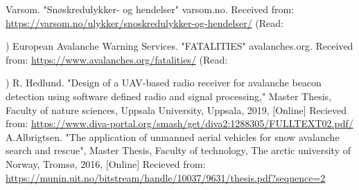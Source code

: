 \documentclass{article}
\begin{document}
\begin{thebibliography}{9}
Varsom. "Snøskredulykker- og hendelser" varsom.no. Received from: \url{https://varsom.no/ulykker/snoskredulykker-og-hendelser/} (Read: \date{09.09.21})
 European Avalanche Warning Services. "FATALITIES" avalanches.org. Received from: \url{https://www.avalanches.org/fatalities/} (Read: \date{09.09.21})
 R. Hedlund. "Design of a UAV-based radio
receiver for avalanche beacon
detection using software defined
radio and signal processing," Master Thesis, Faculty of nature sciences, Uppsala University, Uppsala, 2019, [Online] Recieved from: \url{https://www.diva-portal.org/smash/get/diva2:1288305/FULLTEXT02.pdf/}
A.Albrigtsen. "The application of unmanned aerial vehicles for snow avalanche search and rescue", Master Thesis, Faculty of technology, The arctic university of Norway, Tromsø, 2016, [Online] Recieved from: \url{https://munin.uit.no/bitstream/handle/10037/9631/thesis.pdf?sequence=2}
\end{thebibliography}
\end{document}
